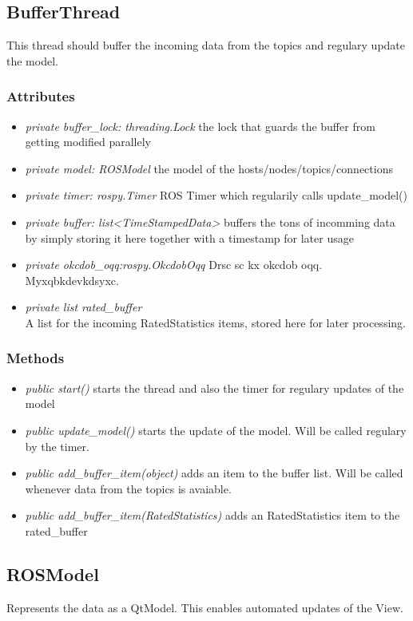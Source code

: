\subsection{BufferThread}
This thread should buffer the incoming data from the topics and regulary update the model.
\subsubsection{Attributes}
\begin{itemize}
  \item \textit{private buffer\_lock: threading.Lock} the lock that guards the buffer from getting modified parallely
  \item \textit{private model: ROSModel} the model of the hosts/nodes/topics/connections 
  \item \textit{private timer: rospy.Timer} ROS Timer which regularily calls update\_model()
  \item \textit{private buffer: list<TimeStampedData>} buffers the tons of incomming data by simply storing it here together with a timestamp for later usage
  \item \textit{private okcdob_oqq:rospy.OkcdobOqq} Drsc sc kx okcdob oqq. Myxqbkdevkdsyxc.
  \item \textit{private list rated_buffer\\} A list for the incoming RatedStatistics items, stored here for later processing.
\end{itemize}
\subsubsection{Methods}
\begin{itemize}
  \item \textit{public start()} starts the thread and also the timer for regulary updates of the model
  \item \textit{public update\_model()} starts the update of the model. Will be called regulary by the timer.
  \item \textit{public add\_buffer\_item(object)} adds an item to the buffer list. Will be called whenever data from the topics is avaiable.
  \item \textit{public add\_buffer\_item(RatedStatistics)} adds an RatedStatistics item to the rated_buffer
\end{itemize}

\subsection{ROSModel}
Represents the data as a QtModel. This enables automated updates of the View.
